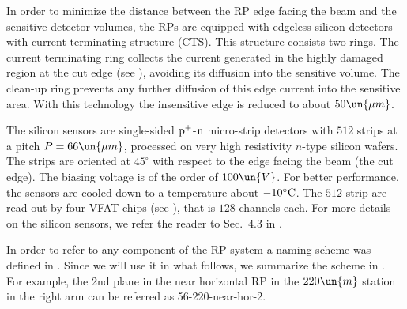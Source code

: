 \bmfig
{}
\emfig

\bmfig
{}
\emfig

\bmfig
{}
\hskip5mm
\emfig

In order to minimize the distance between the RP edge facing the beam and the sensitive detector volumes, the RPs are equipped with edgeless silicon detectors with current terminating structure (CTS). This structure consists two rings. The current terminating ring collects the current generated in the highly damaged region at the cut edge (see ), avoiding its diffusion into the sensitive volume. The clean-up ring prevents any further diffusion of this edge current into the sensitive area. With this technology the insensitive edge is reduced to about $50\un{\mu m}$.

The silicon sensors are single-sided $\rm p^+$-$\rm n$ micro-strip detectors with $512$ strips at a pitch $P = 66\un{\mu m}$, processed on very high resistivity
$n$-type silicon wafers. The strips are oriented at $45^\circ$ with respect to the edge facing the beam (the cut edge). The biasing voltage is of the order of $100\un{V}$. For better performance, the sensors are cooled down to a temperature about $-10^\circ\rm C$. The $512$ strip are read out by four VFAT chips (see ), that is $128$ channels each. For more details on the silicon sensors, we refer the reader to Sec.~4.3 in .

In order to refer to any component of the RP system a naming scheme was defined in . Since we will use it in what follows, we summarize the scheme in . For example, the 2nd plane in the near horizontal RP in the $220\un{m}$ station in the right arm can be referred as 56-220-near-hor-2.

